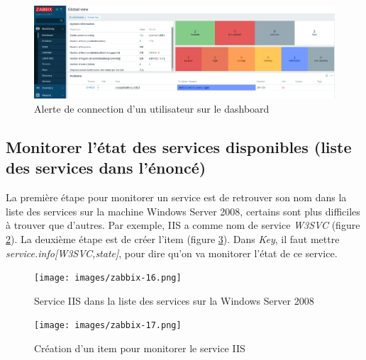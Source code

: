 \documentclass[a4paper]{article}
\begin{document}
\begin{figure}[H]
    \centering
    \includegraphics[width=0.95\linewidth]{images/zabbix-31.png}
    \caption{Alerte de connection d'un utilisateur sur le dashboard}
    \label{fig:zabbix31}
\end{figure}










\newpage \subsection{Monitorer l'état des services disponibles (liste des services dans l'énoncé)}





La première étape pour monitorer un service est de retrouver son nom dans la liste des services sur la machine Windows Server 2008, certains sont plus difficiles à trouver que d'autres. Par exemple, IIS a comme nom de service \textit{W3SVC} (figure \ref{fig:zabbix16}). La deuxième étape est de créer l'item (figure \ref{fig:zabbix17}). Dans \textit{Key}, il faut mettre \textit{service.info[W3SVC,state]}, pour dire qu'on va monitorer l'état de ce service.

\begin{figure}[H]
    \centering
    \texttt{[image: images/zabbix-16.png]}
    \caption{Service IIS dans la liste des services sur la Windows Server 2008}
    \label{fig:zabbix16}
\end{figure}
\begin{figure}[H]
    \centering
    \texttt{[image: images/zabbix-17.png]}
    \caption{Création d'un item pour monitorer le service IIS}
    \label{fig:zabbix17}
\end{figure}
\end{document}

